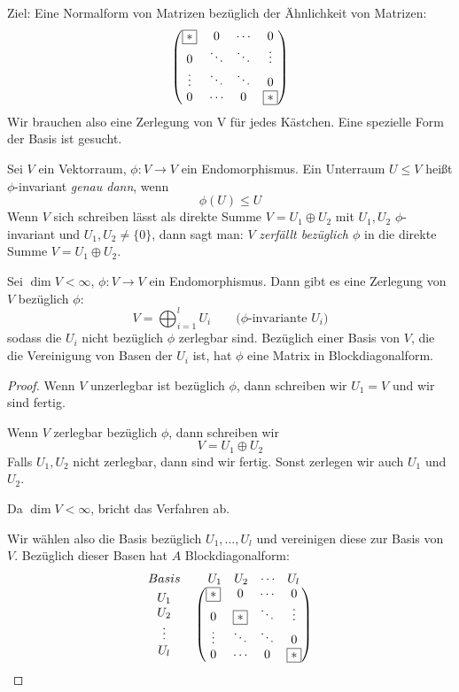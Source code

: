 \documentclass{mycourse}
\begin{document}
Ziel: Eine Normalform von Matrizen bezüglich der Ähnlichkeit von Matrizen:
\[
\begin{pmatrix}\fbox{$*$} & 0 & \cdots & 0 \\ 0 & \ddots & \ddots & \vdots \\ \vdots & \ddots & \ddots & 0 \\ 0 & \cdots & 0 & \fbox{$*$}  \end{pmatrix}
\]
Wir brauchen also eine Zerlegung von V für jedes Kästchen.  Eine spezielle Form der Basis ist gesucht.

\begin{df}
\label{12.6}
Sei $V$ ein Vektorraum, $\phi:V\to V$ ein Endomorphismus.
Ein Unterraum $U\le V$ heißt $\phi$-invariant \emph{genau dann}, wenn
\[
\phi(U) \le U
\]
Wenn $V$ sich schreiben lässt als direkte Summe $V=U_1\oplus U_2$ mit $U_1,U_2$ $\phi$-invariant und $U_1,U_2\neq \{0\}$,
dann sagt man: $V$ \emph{zerfällt bezüglich $\phi$} in die direkte Summe $V=U_1\oplus U_2$.
\end{df}

\begin{lem}
\label{lem:12.7}
Sei $\dim V<\infty$, $\phi:V\to V$ ein Endomorphismus.
Dann gibt es eine Zerlegung von $V$ bezüglich $\phi$:
\[
V=\bigoplus_{i=1}^l U_i\qquad \text{($\phi$-invariante $U_i$)}
\]
sodass die $U_i$ nicht bezüglich $\phi$ zerlegbar sind.
Bezüglich einer Basis von $V$, die die Vereinigung von Basen der $U_i$ ist,
hat $\phi$ eine Matrix in Blockdiagonalform.

\begin{proof}
Wenn $V$ unzerlegbar ist bezüglich $\phi$, dann schreiben wir $U_1=V$ und wir sind fertig.

Wenn $V$ zerlegbar bezüglich $\phi$, dann schreiben wir
\[
V=U_1\oplus U_2
\]
Falls $U_1,U_2$ nicht zerlegbar, dann sind wir fertig. Sonst zerlegen wir auch $U_1$ und $U_2$.

Da $\dim V<\infty$, bricht das Verfahren ab.

Wir wählen also die Basis bezüglich $U_1, ..., U_l$ und vereinigen diese zur Basis von $V$. Bezüglich dieser Basen hat $A$ Blockdiagonalform:
\[
\begin{tabular}{*{3}{>{$}c<{$}}}
  Basis & \begin{matrix} U_1 & U_2 & \cdots & U_l \end{matrix} \\
  \begin{matrix} U_1 \\ U_2 \\ \vdots \\ U_l \end{matrix} &  \begin{pmatrix}\fbox{$*$} & 0 & \cdots & 0 \\ 0 & \fbox{$*$} & \ddots & \vdots \\ \vdots & \ddots & \ddots & 0 \\ 0 & \cdots & 0 & \fbox{$*$}  \end{pmatrix}
\end{tabular}
\]
\end{proof}
\end{lem}
\end{document}
